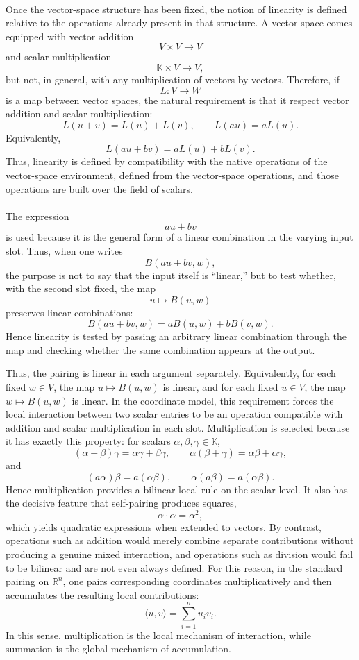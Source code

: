 \documentclass{article}
\begin{document}
	\paragraph{}
	Once the vector-space structure has been fixed, the notion of linearity is defined relative to the operations already present in that structure. A vector space comes equipped with vector addition
	$$
	V\times V\to V
	$$
	and scalar multiplication
	$$
	\mathbb{K}\times V\to V,
	$$
	but not, in general, with any multiplication of vectors by vectors. Therefore, if
	$$
	L:V\to W
	$$
	is a map between vector spaces, the natural requirement is that it respect vector addition and scalar multiplication:
	$$
	L(u+v)=L(u)+L(v),
	\qquad
	L(au)=aL(u).
	$$
	Equivalently,
	$$
	L(au+bv)=aL(u)+bL(v).
	$$
	Thus, linearity is defined by compatibility with the native operations of the vector-space environment, defined from the vector-space operations, and those operations are built over the field of scalars.
	
	\paragraph{}
	The expression
	$$
	au+bv
	$$
	is used because it is the general form of a linear combination in the varying input slot. Thus, when one writes
	$$
	B(au+bv,w),
	$$
	the purpose is not to say that the input itself is ``linear,'' but to test whether, with the second slot fixed, the map
	$$
	u\mapsto B(u,w)
	$$
	preserves linear combinations:
	$$
	B(au+bv,w)=aB(u,w)+bB(v,w).
	$$
	Hence linearity is tested by passing an arbitrary linear combination through the map and checking whether the same combination appears at the output.
	
	Thus, the pairing is linear in each argument separately. Equivalently, for each fixed $w\in V$, the map $u\mapsto B(u,w)$ is linear, and for each fixed $u\in V$, the map $w\mapsto B(u,w)$ is linear. In the coordinate model, this requirement forces the local interaction between two scalar entries to be an operation compatible with addition and scalar multiplication in each slot. Multiplication is selected because it has exactly this property: for scalars $\alpha,\beta,\gamma\in\mathbb{K}$,
	$$
	(\alpha+\beta)\gamma=\alpha\gamma+\beta\gamma,
	\qquad
	\alpha(\beta+\gamma)=\alpha\beta+\alpha\gamma,
	$$
	and
	$$
	(a\alpha)\beta=a(\alpha\beta),\qquad \alpha(a\beta)=a(\alpha\beta).
	$$
	Hence multiplication provides a bilinear local rule on the scalar level. It also has the decisive feature that self-pairing produces squares,
	$$
	\alpha\cdot\alpha=\alpha^2,
	$$
	which yields quadratic expressions when extended to vectors. By contrast, operations such as addition would merely combine separate contributions without producing a genuine mixed interaction, and operations such as division would fail to be bilinear and are not even always defined. For this reason, in the standard pairing on $\mathbb{R}^n$, one pairs corresponding coordinates multiplicatively and then accumulates the resulting local contributions:
	$$
	\langle u,v\rangle=\sum_{i=1}^n u_i v_i.
	$$
	In this sense, multiplication is the local mechanism of interaction, while summation is the global mechanism of accumulation.
\end{document}
